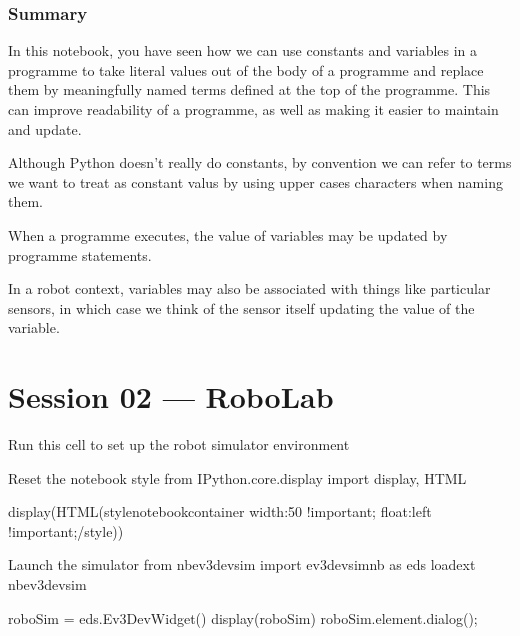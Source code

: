 \documentclass[letterpaper,10pt,english]{sphinxmanual}
\begin{document}


\subsubsection{Summary}
\label{\detokenize{content/01_Robot_Lab/Section_00_02:Summary}}
In this notebook, you have seen how we can use constants and variables in a programme to take literal values out of the body of a programme and replace them by meaningfully named terms defined at the top of the programme. This can improve readability of a programme, as well as making it easier to maintain and update.

Although Python doesn’t really do constants, by convention we can refer to terms we want to treat as constant valus by using upper cases characters when naming them.

When a programme executes, the value of variables may be updated by programme statements.

In a robot context, variables may also be associated with things like particular sensors, in which case we think of the sensor itself updating the value of the variable.


\section{Session 02 — RoboLab}
\label{\detokenize{index:session-02-robolab}}
{
\begin{sphinxVerbatim}[commandchars=\\\{\}]
\llap{\color{nbsphinxin}[ ]:\,\hspace{\fboxrule}\hspace{\fboxsep}}\PYGZsh{} Run this cell to set up the robot simulator environment

\PYGZsh{}Reset the notebook style
from IPython.core.display import display, HTML

display(HTML(\PYGZdq{}\PYGZlt{}style\PYGZgt{}\PYGZsh{}notebook\PYGZhy{}container \PYGZob{} width:50\PYGZpc{} !important; float:left !important;\PYGZcb{}\PYGZlt{}/style\PYGZgt{}\PYGZdq{}))


\PYGZsh{}Launch the simulator
from nbev3devsim import ev3devsim\PYGZus{}nb as eds
\PYGZpc{}load\PYGZus{}ext nbev3devsim

roboSim = eds.Ev3DevWidget()
display(roboSim)
roboSim.element.dialog();
\end{sphinxVerbatim}
}
\end{document}
